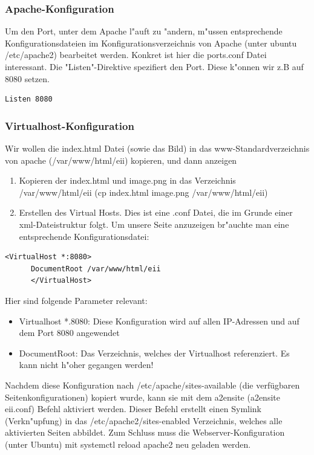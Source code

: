 \documentclass[a4paper,11pt,titlepage]{article}
\begin{document}
    \subsubsection{Apache-Konfiguration}
    Um den Port, unter dem Apache l"auft zu "andern, m"ussen entsprechende Konfigurationsdateien im Konfigurationsverzeichnis von Apache (unter ubuntu /etc/apache2) bearbeitet werden.
    Konkret ist hier die ports.conf Datei interessant. Die "Listen"-Direktive spezifiert den Port. Diese k"onnen wir z.B auf 8080 setzen.

    \begin{lstlisting}[caption={ports.conf},label={lst:lstlisting}]
        Listen 8080
    \end{lstlisting}

    \subsubsection{Virtualhost-Konfiguration}
    Wir wollen die index.html Datei (sowie das Bild) in das www-Standardverzeichnis von apache (/var/www/html/eii) kopieren, und dann anzeigen
    \begin{enumerate}
        \item Kopieren der index.html und image.png in das Verzeichnis /var/www/html/eii (cp index.html image.png /var/www/html/eii)
        \item Erstellen des Virtual Hosts. Dies ist eine .conf Datei, die im Grunde einer xml-Dateistruktur folgt. Um unsere Seite anzuzeigen br"auchte man eine entsprechende Konfigurationsdatei:
    \end{enumerate}

    \begin{lstlisting}[caption={eii.conf},label={lst:lstlisting-2}]
      <VirtualHost *:8080>
      DocumentRoot /var/www/html/eii
      </VirtualHost>
    \end{lstlisting}

    Hier sind folgende Parameter relevant:
    \begin{itemize}
        \item Virtualhost *.8080: Diese Konfiguration wird auf allen IP-Adressen und auf dem Port 8080 angewendet
        \item DocumentRoot: Das Verzeichnis, welches der Virtualhost referenziert. Es kann nicht h"oher gegangen werden!
    \end{itemize}

    Nachdem diese Konfiguration nach /etc/apache/sites-available (die verfügbaren Seitenkonfigurationen) kopiert wurde, kann sie mit dem a2ensite (a2ensite eii.conf) Befehl aktiviert werden. Dieser Befehl erstellt einen Symlink (Verkn"upfung) in das /etc/apache2/sites-enabled Verzeichnis, welches alle aktivierten Seiten abbildet.
    Zum Schluss muss die Webserver-Konfiguration (unter Ubuntu) mit systemctl reload apache2 neu geladen werden.
\end{document}
